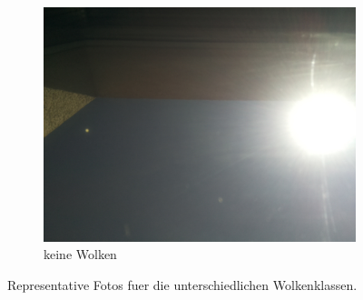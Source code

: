 \begin{figure}[h]
\begin{subfigure}[b]{0.31\textwidth}
		\end{subfigure}
		\begin{subfigure}[b]{0.31\textwidth}
		\begin{center}
				\includegraphics[width=\textwidth]{./pictures/cloudtypes/no_clouds.pdf}
		\end{center}
		\caption{keine Wolken}
		\label{fig:no_clouds}
		\end{subfigure}
		\caption{Representative Fotos fuer die unterschiedlichen Wolkenklassen.}
		\label{fig:}
\end{figure}
